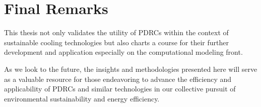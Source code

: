 \section{Final Remarks}

This thesis not only validates the utility of PDRCs within the context of sustainable cooling technologies but also charts a course for their further development and application especially on the computational modeling front.

As we look to the future, the insights and methodologies presented here will serve as a valuable resource for those endeavoring to advance the efficiency and applicability of PDRCs and similar technologies in our collective pursuit of environmental sustainability and energy efficiency.